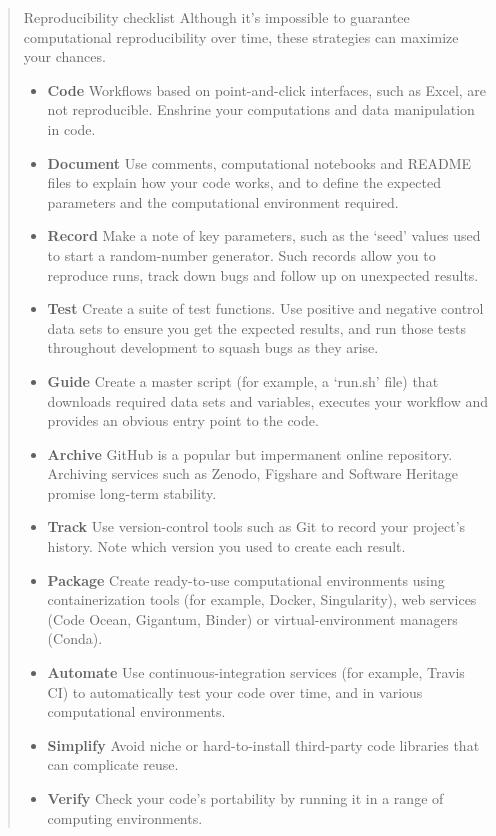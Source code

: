 \begin{quotation}
Reproducibility checklist Although it’s impossible to guarantee computational
reproducibility over time, these strategies can maximize your chances.
\begin{itemize}
\item \textbf{Code} Workflows based on point-and-click interfaces, such as
Excel, are not reproducible. Enshrine your computations and data manipulation in
code.
\item \textbf{Document} Use comments, computational notebooks and README files
to explain how your code works, and to define the expected parameters and the
computational environment required.
\item \textbf{Record} Make a note of key parameters, such as the ‘seed’ values
used to start a random-number generator. Such records allow you to reproduce
runs, track down bugs and follow up on unexpected results.
\item \textbf{Test} Create a suite of test functions. Use positive and negative
control data sets to ensure you get the expected results, and run those tests
throughout development to squash bugs as they arise.
\item \textbf{Guide} Create a master script (for example, a ‘run.sh’ file) that
downloads required data sets and variables, executes your workflow and provides
an obvious entry point to the code.
\item \textbf{Archive} GitHub is a popular but impermanent online repository.
Archiving services such as Zenodo, Figshare and Software Heritage promise
long-term stability.
\item \textbf{Track} Use version-control tools such as Git to record your
project’s history. Note which version you used to create each result.
\item \textbf{Package} Create ready-to-use computational environments using
containerization tools (for example, Docker, Singularity), web services (Code
Ocean, Gigantum, Binder) or virtual-environment managers (Conda).
\item \textbf{Automate} Use continuous-integration services (for example, Travis
CI) to automatically test your code over time, and in various computational
environments.
\item \textbf{Simplify} Avoid niche or hard-to-install third-party code
libraries that can complicate reuse.
\item \textbf{Verify} Check your code’s portability by running it in a range of
computing environments.
\end{itemize}
\end{quotation}

